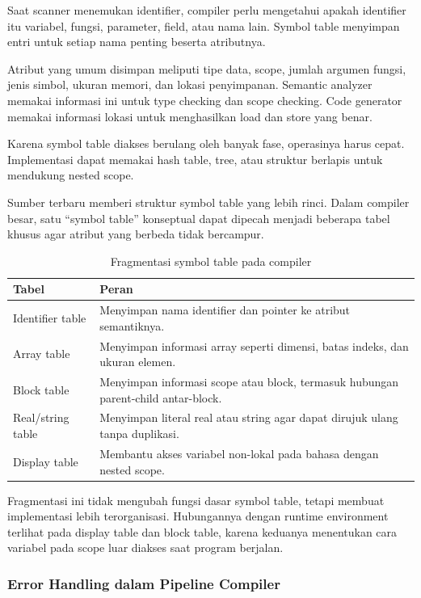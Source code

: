 Saat scanner menemukan identifier, compiler perlu mengetahui apakah identifier itu variabel, fungsi, parameter, field, atau nama lain. Symbol table menyimpan entri untuk setiap nama penting beserta atributnya.

Atribut yang umum disimpan meliputi tipe data, scope, jumlah argumen fungsi, jenis simbol, ukuran memori, dan lokasi penyimpanan. Semantic analyzer memakai informasi ini untuk type checking dan scope checking. Code generator memakai informasi lokasi untuk menghasilkan load dan store yang benar.

Karena symbol table diakses berulang oleh banyak fase, operasinya harus cepat. Implementasi dapat memakai hash table, tree, atau struktur berlapis untuk mendukung nested scope.

Sumber terbaru memberi struktur symbol table yang lebih rinci. Dalam compiler besar, satu ``symbol table'' konseptual dapat dipecah menjadi beberapa tabel khusus agar atribut yang berbeda tidak bercampur.

\begin{table}[H]
\centering
\begin{tabularx}{\textwidth}{|L{0.24\textwidth}|X|}
\hline
\textbf{Tabel} & \textbf{Peran} \\
\hline
Identifier table & Menyimpan nama identifier dan pointer ke atribut semantiknya. \\
\hline
Array table & Menyimpan informasi array seperti dimensi, batas indeks, dan ukuran elemen. \\
\hline
Block table & Menyimpan informasi scope atau block, termasuk hubungan parent-child antar-block. \\
\hline
Real/string table & Menyimpan literal real atau string agar dapat dirujuk ulang tanpa duplikasi. \\
\hline
Display table & Membantu akses variabel non-lokal pada bahasa dengan nested scope. \\
\hline
\end{tabularx}
\caption{Fragmentasi symbol table pada compiler}
\label{tab:fragmentasi-symbol-table}
\end{table}

Fragmentasi ini tidak mengubah fungsi dasar symbol table, tetapi membuat implementasi lebih terorganisasi. Hubungannya dengan runtime environment terlihat pada display table dan block table, karena keduanya menentukan cara variabel pada scope luar diakses saat program berjalan.

\subsubsection{Error Handling dalam Pipeline Compiler}

